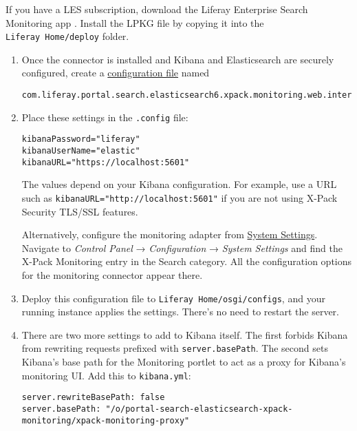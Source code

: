 If you have a LES subscription, download the Liferay Enterprise Search
Monitoring app . Install the LPKG file by copying it into the
\texttt{Liferay\ Home/deploy} folder.

\begin{enumerate}
\def\labelenumi{\arabic{enumi}.}
\item
  Once the connector is installed and Kibana and Elasticsearch are
  securely configured, create a
  \href{/docs/7-2/user/-/knowledge_base/u/understanding-system-configuration-files}{configuration
  file} named

\begin{verbatim}
com.liferay.portal.search.elasticsearch6.xpack.monitoring.web.internal.configuration.XPackMonitoringConfiguration.config
\end{verbatim}
\item
  Place these settings in the \texttt{.config} file:

\begin{verbatim}
kibanaPassword="liferay"
kibanaUserName="elastic"
kibanaURL="https://localhost:5601"
\end{verbatim}

  The values depend on your Kibana configuration. For example, use a URL
  such as \texttt{kibanaURL="http://localhost:5601"} if you are not
  using X-Pack Security TLS/SSL features.

  Alternatively, configure the monitoring adapter from
  \href{/docs/7-2/user/-/knowledge_base/u/system-settings}{System
  Settings}. Navigate to \emph{Control Panel} → \emph{Configuration} →
  \emph{System Settings} and find the X-Pack Monitoring entry in the
  Search category. All the configuration options for the monitoring
  connector appear there.
\item
  Deploy this configuration file to \texttt{Liferay\ Home/osgi/configs},
  and your running instance applies the settings. There's no need to
  restart the server.
\item
  There are two more settings to add to Kibana itself. The first forbids
  Kibana from rewriting requests prefixed with \texttt{server.basePath}.
  The second sets Kibana's base path for the Monitoring portlet to act
  as a proxy for Kibana's monitoring UI. Add this to
  \texttt{kibana.yml}:

\begin{verbatim}
server.rewriteBasePath: false
server.basePath: "/o/portal-search-elasticsearch-xpack-monitoring/xpack-monitoring-proxy"
\end{verbatim}


\end{enumerate}
